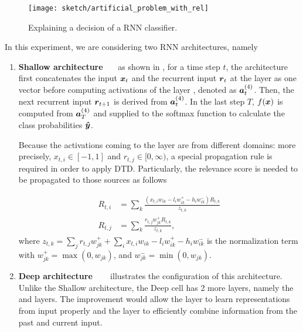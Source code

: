  \begin{figure}[!hbt]
		\centering
		\texttt{[image: sketch/artificial\_problem\_with\_rel]}
		\caption{Explaining a decision of a RNN classifier.} 
		\label{fig:artificial_problem}
\end{figure}


\begin{figure}[!htb]
\centering

     \hfill
{}
\end{figure}

In this experiment, we are considering two RNN architectures, namely

\begin{enumerate}
	\item \textbf{Shallow architecture}  \ \ \ as shown in \addfigure{\ref{fig:shallow_arch}}, for a time step $t$, the  architecture first concatenates the input $\patvector{x}_t$  and the recurrent input $\patvector{r}_t$ at the layer  as one vector before computing activations of the layer , denoted as $\patvector{a}_t^{(4)}$. Then,  the next recurrent input $\patvector{r}_{t+1}$ 	 is derived from $\patvector{a}_t^{(4)}$. In the last step $T$, $f(\boldsymbol{x})$ is computed from $\patvector{a}^{(4)}_{T}$ and supplied to the softmax function to calculate the class probabilities $\patvector{\hat{y}}$. 
		
Because the activations coming to the layer  are from different domains: more precisely, $x_{t,i} \in [-1, 1]$ and $r_{t,j} \in [0, \infty) $, a special propagation rule is required in order to apply DTD. Particularly, the relevance score is needed to be propagated to those sources as follows
		
\begin{align*}
	R_{t, i} &= \sum_k \frac{(x_{t, i} w_{ik} - l_i w_{ik}^+ - h_i w_{ik}^-) R_{t,k}}{z_{t,k}} \\	
     R_{t, j} &= \sum_k \frac{r_{t, j} w_{jk}^+ R_{t,k}}{z_{t,k}},
\end{align*}
where $z_{t,k} = \sum_j r_{t,j} w_{jk}^+ + \sum_i x_{t,i} w_{ik} - l_i w_{ik}^+ - h_i w_{ik}^-$ is the normalization term with $w_{jk}^+ = \max(0, w_{jk})$, and $w_{jk}^- = \min(0, w_{jk})$.

	\item \textbf{Deep architecture} \ \ \ \addfigure{\ref{fig:deep_arch}} illustrates the configuration of this architecture. Unlike the Shallow architecture, the Deep cell has 2 more layers, namely the  and  layers.  The improvement would allow the  layer to learn representations from input properly and the  layer to efficiently combine information from the past and current input. 
\end{enumerate}

